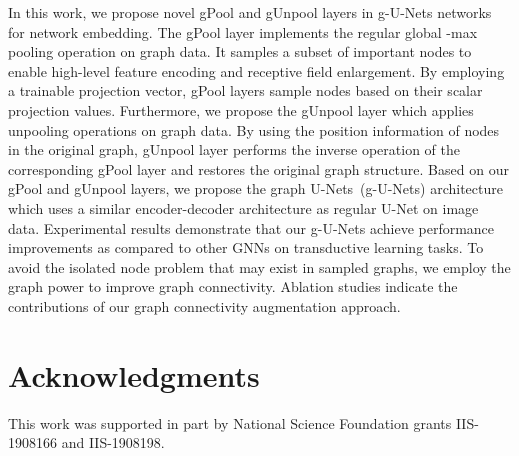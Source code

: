 \documentclass{article}
\begin{document}
In this work, we propose novel gPool and gUnpool layers in g-U-Nets
networks for network embedding. The gPool layer implements the
regular global -max pooling operation on graph data. It samples a
subset of important nodes to enable high-level feature encoding and
receptive field enlargement. By employing a trainable projection
vector, gPool layers sample nodes based on their scalar projection
values. Furthermore, we propose the gUnpool layer which applies
unpooling operations on graph data. By using the position
information of nodes in the original graph, gUnpool layer performs
the inverse operation of the corresponding gPool layer and restores
the original graph structure. Based on our gPool and gUnpool layers,
we propose the graph U-Nets~(g-U-Nets) architecture which uses a
similar encoder-decoder architecture as regular U-Net on image data.
Experimental results demonstrate that our g-U-Nets achieve
performance improvements as compared to other GNNs on transductive
learning tasks. To avoid the isolated node problem that may exist in
sampled graphs, we employ the  graph power to improve graph
connectivity. Ablation studies indicate the contributions of our
graph connectivity augmentation approach.

\clearpage

\section*{Acknowledgments}

This work was supported in part by National Science Foundation grants
IIS-1908166 and IIS-1908198.






\end{document}
